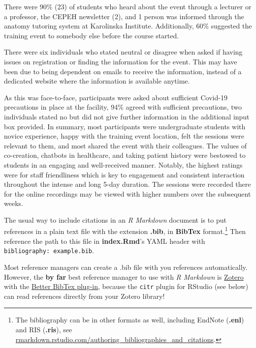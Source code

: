 \documentclass[a4paper, nobind]{templates/ociamthesis}
\begin{document}
There were 90\% (23) of students who heard about the event through a lecturer or a professor, the CEPEH newsletter (2), and 1 person was informed through the anatomy tutoring system at Karolinska Institute. Additionally, 60\% suggested the training event to somebody else before the course started.

There were six individuals who stated neutral or disagree when asked if having issues on registration or finding the information for the event. This may have been due to being dependent on emails to receive the information, instead of a dedicated website where the information is available anytime.

As this was face-to-face, participants were asked about sufficient Covid-19 precautions in place at the facility, 94\% agreed with sufficient precautions, two individuals stated no but did not give further information in the additional input box provided.
In summary, most participants were undergraduate students with novice experience, happy with the training event location, felt the sessions were relevant to them, and most shared the event with their colleagues. The values of co-creation, chatbots in healthcare, and taking patient history were bestowed to students in an engaging and well-received manner. Notably, the highest ratings were for staff friendliness which is key to engagement and consistent interaction throughout the intense and long 5-day duration. The sessions were recorded there for the online recordings may be viewed with higher numbers over the subsequent weeks.

The usual way to include citations in an \emph{R Markdown} document is to put references in a plain text file with the extension \textbf{.bib}, in \textbf{BibTex} format.\footnote{The bibliography can be in other formats as well, including EndNote (\textbf{.enl}) and RIS (\textbf{.ris}), see \href{https://rmarkdown.rstudio.com/authoring_bibliographies_and_citations.html}{rmarkdown.rstudio.com/authoring\_bibliographies\_and\_citations}.}
Then reference the path to this file in \textbf{index.Rmd}'s YAML header with \texttt{bibliography:\ example.bib}.

Most reference managers can create a .bib file with you references automatically.
However, the \textbf{by far} best reference manager to use with \emph{R Markdown} is \href{https://www.zotero.org}{Zotero} with the \href{https://retorque.re/zotero-better-bibtex/}{Better BibTex plug-in}, because the \texttt{citr} plugin for RStudio (see below) can read references directly from your Zotero library!
\end{document}

